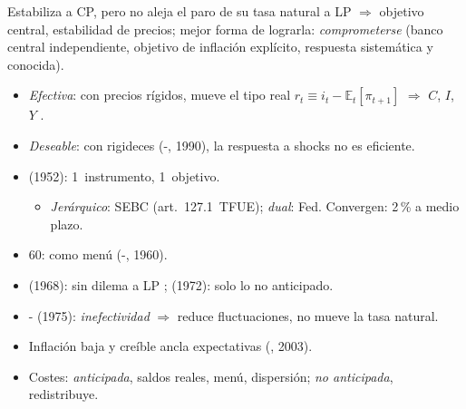 \documentclass{article}
\begin{document}
\begin{columnas}
\begin{ideaclave}
Estabiliza a CP, pero no aleja el paro de su tasa natural a LP $\Rightarrow$ objetivo central, estabilidad de precios; mejor forma de lograrla: \emph{comprometerse} (banco central independiente, objetivo de inflación explícito, respuesta sistemática y conocida).
\end{ideaclave}

\begin{itemize}
\item \emph{Efectiva}: con precios rígidos, mueve el tipo real $r_t\equiv i_t-\mathbb{E}_t[\pi_{t+1}]$ $\Rightarrow$ $C$, $I$, $Y$ .
\item \emph{Deseable}: con rigideces (-, 1990), la respuesta a shocks no es eficiente.
\end{itemize}
\begin{itemize}
\item {} (1952): 1~instrumento, 1~objetivo.
  \begin{itemize}
  \item \emph{Jerárquico}: SEBC (art.\ 127.1~TFUE); \emph{dual}: Fed. Convergen: 2\,\% a medio plazo.
  \end{itemize}
\end{itemize}
\begin{itemize}
\item 60:  como menú (-, 1960).
\item {} (1968): sin dilema a LP ;  (1972): solo lo no anticipado.
\item {}- (1975): \emph{inefectividad}  $\Rightarrow$ reduce fluctuaciones, no mueve la tasa natural.
\end{itemize}
\begin{itemize}
\item Inflación baja y creíble ancla expectativas (, 2003).
\item Costes: \emph{anticipada}, saldos reales, menú, dispersión; \emph{no anticipada}, redistribuye.
\end{itemize}

\end{columnas}
\end{document}
